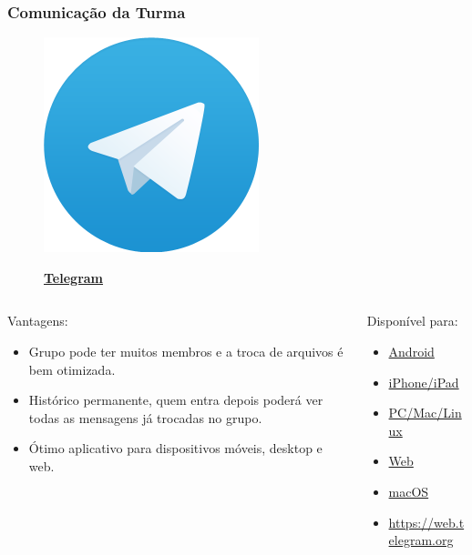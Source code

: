 \begin{frame}[t]\frametitle{Comunicação da Turma}

  \begin{figure}[htb]
    \centering{}
    \includegraphics[width=0.07\linewidth]{img/sec03/telegram.png}

    \textbf{\href{https://telegram.org}{Telegram}}
  \end{figure}

  \begin{columns}[onlytextwidth,T]

    \begin{column}{0.48\linewidth}
      \begin{block}{Vantagens:}
        \begin{itemize}
          \justifying{}
          \item Grupo pode ter muitos membros e a troca de arquivos é bem otimizada.
          \item Histórico permanente, quem entra depois poderá ver todas as mensagens já trocadas no grupo.
          \item Ótimo aplicativo para dispositivos móveis, desktop e web.
        \end{itemize}
      \end{block}
    \end{column}

    \begin{column}{0.48\linewidth}
      \begin{block}{Disponível para:}
        \begin{itemize}
          \justifying{}
          \item \href{https://telegram.org/dl/android}{Android}
          \item \href{https://telegram.org/dl/ios}{iPhone/iPad}
          \item \href{https://desktop.telegram.org}{PC/Mac/Linux}
          \item \href{https://web.telegram.org}{Web}
          \item \href{https://macos.telegram.org}{macOS}
          \item \href{https://web.telegram.org}{https://web.telegram.org}
        \end{itemize}
      \end{block}
    \end{column}

  \end{columns}

\end{frame}
